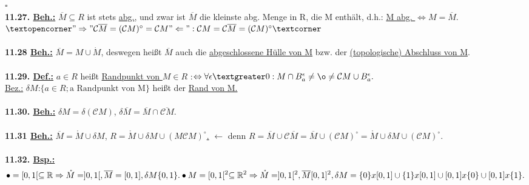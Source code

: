\documentclass[]{scrartcl}
\begin{document}
	\strut\hfill$\square$\\
	\textbf{11.27. \underline{Beh.:}} \ul{$\overline{M}\subseteq R$} ist stets \ul{abg.}, und zwar ist $\overline{M}$ die kleinste abg. Menge in R, die M enthält, d.h.: \ul{M abg. $\Leftrightarrow M = \overline{M}$}. $\textopencorner"\Rightarrow" \mathcal{C}\overline{M}=(\mathcal{C}M)^\circ=\mathcal{C}M "\Leftarrow": \mathcal{C}M=\mathcal{C}\overline{M}=(\mathcal{C}M)^\circ\textcorner$\\
	\\
	\textbf{11.28 \underline{Beh.:}} \ul{$\overline{M}=M\cup\dot{M}$}, deswegen heißt $\overline{M}$ auch die  \ul{abgeschlossene Hülle von M} bzw. der \ul{(topologische) Abschluss von M}.\\
	\\
	\textbf{11.29. \underline{Def.:}} $a\in R$ heißt \ul{Randpunkt von $M\in R$} :$\Leftrightarrow \forall \epsilon \textgreater0: M \cap B_a^\epsilon\neq \o\neq\mathcal{C}M\cup B_a^\epsilon.$\\
	\underline{Bez.:}  \ul{$\delta M$}:$\{a\in R; \text{a Randpunkt von M}\}$ heißt der   \ul{Rand von M.}\\
	\\
	\textbf{11.30. \underline{Beh.:}} \ul{$\delta M = \delta (\mathcal{C}M)$}, \ul{$\delta \overline{M}=\overline{M}\cap\overline{\mathcal{C}M}$}.\\
	\\
	\textbf{11.31 \underline{Beh.:}} \ul{$\overline{M} = \mathring{M} \cup \delta M$}, \ul{$R=\mathring{M}\cup \delta M \cup (M\mathcal{C} M)^\circ$.} $ \leftarrow$ denn $R=\overline{M} \cup \mathcal{C}\overline{M}=\overline{M} \cup ( \mathcal{C}M)^\circ = \mathring{M}\cup \delta M \cup (\mathcal{C}M)^\circ$.\\
	\\
	\textbf{11.32. \underline{Bsp.:}}\\
	\begin{equation}
		\bullet = [0,1[ \subseteq \mathbb{R}\Rightarrow \mathring{M}=]0,1[, \overline{M}= [0,1], \delta M \{0,1\}.\\
		\bullet M = [0,1[^2\subseteq \mathbb{R}^2\Rightarrow \mathring{M}=]0,1[^2, \overline{M}[0,1]^2,\\
		\delta M = \{0\} x [0,1]\cup \{1\} x [0,1] \cup [0,1] x \{0\} \cup [0,1] x \{1\}.
	\end{equation} 
	
	
	
	
		
	
\end{document}
